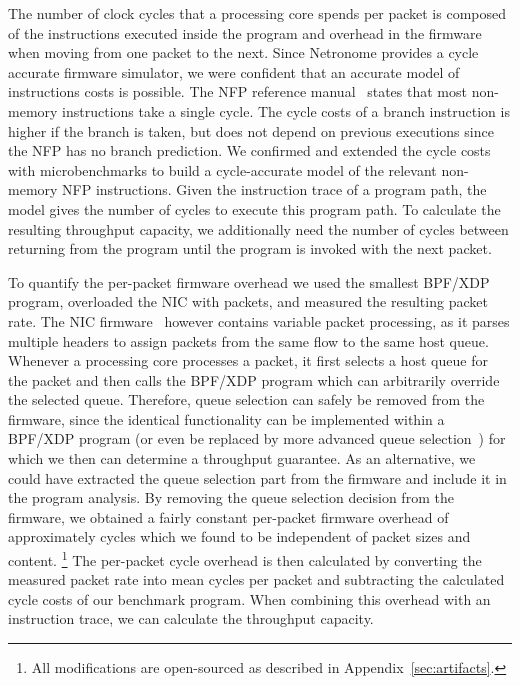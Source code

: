 \documentclass[sigconf,screen,authordraft]{acmart}
\newcommand{\afblock}[1]{\noindent{\textbf{#1.}}}
\begin{document}
\afblock{Clock Cycles per Packet}
The number of clock cycles that a processing core spends per packet is composed of the instructions executed inside the program and overhead in the firmware when moving from one packet to the next.
Since Netronome provides a cycle accurate firmware simulator, we were confident that an accurate model of instructions costs is possible.
The \ac{NFP} reference manual~\cite{reference-manual} states that most non-memory instructions take a single cycle.
The cycle costs of a branch instruction is higher if the branch is taken, but does not depend on previous executions since the \ac{NFP} has no branch prediction.
We confirmed and extended the cycle costs with microbenchmarks to build a cycle-accurate model of the relevant non-memory \ac{NFP} instructions.
Given the instruction trace of a program path, the model gives the number of cycles to execute this program path.
To calculate the resulting throughput capacity, we additionally need the number of cycles between returning from the program until the program is invoked with the next packet.

To quantify the per-packet firmware overhead we used the smallest BPF/XDP program, overloaded the NIC with packets, and measured the resulting packet rate.
The NIC firmware~\cite{nic-firmware} however contains variable packet processing, as it parses multiple headers to assign packets from the same flow to the same host queue.
Whenever a processing core processes a packet, it first selects a host queue for the packet and then calls the BPF/XDP program which can arbitrarily override the selected queue.
Therefore, queue selection can safely be removed from the firmware, since the identical functionality can be implemented within a BPF/XDP program (or even be replaced by more advanced queue selection~\cite{smart-RSS}) for which we then can determine a throughput guarantee.
As an alternative, we could have extracted the queue selection part from the firmware and include it in the program analysis.
By removing the queue selection decision from the firmware, we obtained a fairly constant per-packet firmware overhead of approximately \unit[224]{cycles} which we found to be independent of packet sizes and content.
\footnote{All modifications are open-sourced as described in Appendix~\ref{sec:artifacts}.} 
The per-packet cycle overhead is then calculated by converting the measured packet rate into mean cycles per packet and subtracting the calculated cycle costs of our benchmark program.
When combining this overhead with an instruction trace, we can calculate the throughput capacity.
\end{document}
